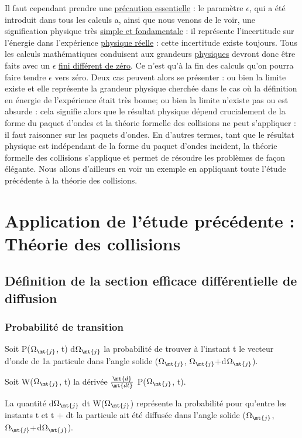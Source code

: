 Il faut cependant prendre une \ul{précaution essentielle} : le
paramètre $\epsilon$, qui a été introduit dans tous les calculs a, ainsi que nous
venons de le voir, une signification physique très \ul{simple et fondamentale} :
il représente l'incertitude sur l'énergie dans l'expérience \ul{physique réelle} :
cette incertitude existe toujours. Tous les calculs mathématiques conduisent
aux grandeurs \ul{physiques} devront donc être faits avec un $\epsilon$ \ul{fini différent de
zéro}. Ce n'est qu'à la fin des calculs qu'on pourra faire tendre $\epsilon$ vers zéro.
Deux cas peuvent alors se présenter : ou bien la limite existe et elle
représente la grandeur physique cherchée dans le cas où la définition en
énergie de l'expérience était très bonne; ou bien la limite n'existe pas
ou est absurde : cela signifie alors que le résultat physique dépend crucialement
de la forme du paquet d'ondes et la théorie formelle des collisions
ne peut s'appliquer : il faut raisonner sur les paquets d'ondes.
En d'autres termes, tant que le résultat physique est indépendant de la
forme du paquet d'ondes incident, la théorie formelle des collisions
s'applique et permet de résoudre les problèmes de façon élégante. Nous
allons d'ailleurs en voir un exemple en appliquant toute l'étude précédente à la
théorie des collisions.

\section{Application de l'étude précédente : Théorie des collisions}%
\subsection{Définition de la section efficace différentielle de diffusion}%

\subsubsection{Probabilité de transition}%

Soit P($\Omega_\mt{j}$, t) d$\Omega_\mt{j}$ la probabilité de trouver à l'instant t le
vecteur d'onde de 1a particule dans l'angle solide ($\Omega_\mt{j}$, $\Omega_\mt{j}+$d$\Omega_\mt{j}$).

Soit W($\Omega_\mt{j}$, t) la dérivée $\frac{\mt{d}}{\mt{dt}}$ P($\Omega_\mt{j}$, t).

La quantité d$\Omega_\mt{j}$ dt W($\Omega_\mt{j}$) représente la probabilité pour
qu'entre les instants t et t $+$ dt la particule ait été diffusée dans
l'angle solide ($\Omega_\mt{j}$, $\Omega_\mt{j}+$d$\Omega_\mt{j}$).


